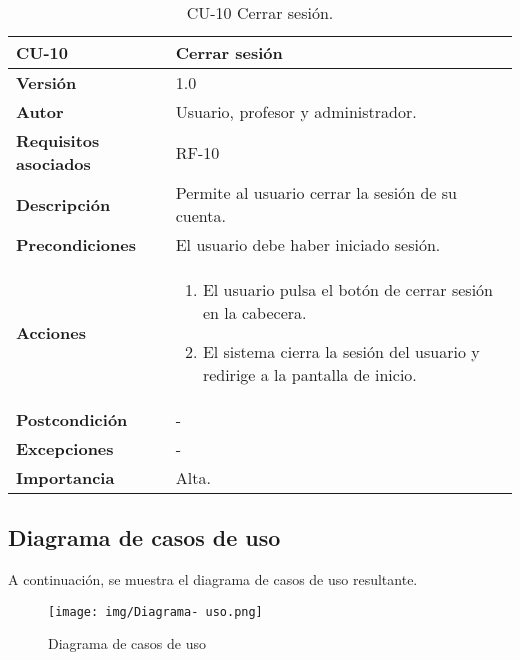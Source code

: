 \begin{table}[p]
	\centering
	\begin{tabularx}{\linewidth}{ p{} p{} }
		\toprule
		\textbf{CU-10}    & \textbf{Cerrar sesión}\\
		\toprule
		\textbf{Versión}              & 1.0    \\
		\textbf{Autor}                & Usuario, profesor y administrador. \\
		\textbf{Requisitos asociados} & RF-10 \\
		\textbf{Descripción}          & Permite al usuario cerrar la sesión de su cuenta. \\
		\textbf{Precondiciones}         & El usuario debe haber iniciado sesión. \\
		\textbf{Acciones}             &
		\begin{enumerate}
			\def\labelenumi{\arabic{enumi}.}
			\tightlist
			\item El usuario pulsa el botón de cerrar sesión en la cabecera.
            \item El sistema cierra la sesión del usuario y redirige a la pantalla de inicio.
		\end{enumerate}\\
         \textbf{Postcondición}             & - \\
		\textbf{Excepciones}             & - \\
		\textbf{Importancia}          & Alta. \\
		\bottomrule
	\end{tabularx}
	\caption{CU-10 Cerrar sesión.}
\end{table}


\subsection{Diagrama de casos de uso}
A continuación, se muestra el diagrama de casos de uso resultante.

\begin{figure}[h]
    \advance\leftskip-4cm 
    \texttt{[image: img/Diagrama- uso.png]}
    \caption{Diagrama de casos de uso}
\end{figure}

